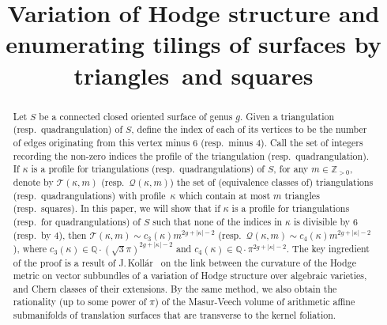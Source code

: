 \documentclass[JEP,XML,SOM,Unicode]{cedram}
\theoremstyle{plain}
\theoremstyle{definition}
\begin{document}
\frontmatter
\title[VHS and enumerating tilings]{Variation of Hodge structure and enumerating tilings of surfaces by triangles~and squares}

\author[\initial{V.} \lastname{Koziarz}]{ }
\address{Université de Bordeaux, IMB, CNRS, UMR 5251\\
F-33400 Talence, France}

\author[\initial{D.-M.} \lastname{Nguyen}]{ }
\address{Université de Bordeaux, IMB, CNRS, UMR 5251\\
F-33400 Talence, France}

\begin{abstract}
Let $S$ be a connected closed oriented surface of genus $g$.
Given a triangulation (resp.\ quadrangulation) of $S$, define the index of each of its vertices to be the number of edges originating from this vertex minus $6$ (resp.\ minus $4$). Call the set of integers recording the non-zero indices the profile of the triangulation (resp.\ quadrangulation).
If $\kappa$ is a profile for triangulations (resp.\ quadrangulations) of $S$, for any $m\in \mathbb{Z}_{>0}$, denote by $\mathscr{T}(\kappa,m)$ (resp.\ $\mathscr{Q}(\kappa,m)$) the set of (equivalence classes of) triangulations (resp.\ quadrangulations) with profile~$\kappa$ which contain at most $m$ triangles (resp.\ squares).
In this paper, we will show that if $\kappa$ is a profile for triangulations (resp.\ for quadrangulations) of $S$ such that none of the indices in $\kappa$ is divisible by $6$ (resp.\ by $4$), then $\mathscr{T}(\kappa,m)\sim c_3(\kappa)m^{2g+|\kappa|-2}$ (resp.\ $\mathscr{Q}(\kappa,m)\sim c_4(\kappa)m^{2g+|\kappa|-2}$), where $c_3(\kappa) \in \mathbb{Q}\cdot(\sqrt{3}\pi)^{2g+|\kappa|-2}$ and $c_4(\kappa)\in \mathbb{Q}\cdot\pi^{2g+|\kappa|-2}$.
The key ingredient of the proof is a result of J.\,Kollár~ on the link between the curvature of the Hodge metric on vector subbundles of a variation of Hodge structure over algebraic varieties, and Chern classes of their extensions.
By the same method, we also obtain the rationality (up to some power of $\pi$) of the Masur-Veech volume of arithmetic affine submanifolds of translation surfaces that are transverse to the kernel foliation.
\end{abstract}
\end{document}
